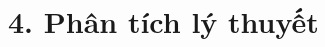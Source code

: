 \documentclass[../main.tex]{subfiles}
\begin{document}
\section{4. Phân tích lý thuyết}

\end{document}
